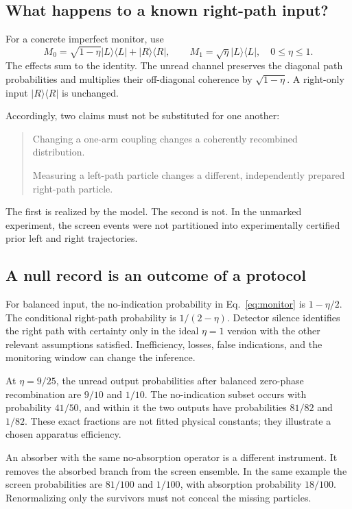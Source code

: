 \documentclass[11pt,a4paper]{article}
\newcommand{\ket}[1]{\lvert #1\rangle}
\newcommand{\bra}[1]{\langle #1\rvert}
\begin{document}
\subsection{What happens to a known right-path input?}
For a concrete imperfect monitor, use
\begin{equation}
M_0=\sqrt{1-\eta}\ket L\bra L+\ket R\bra R,\qquad
M_1=\sqrt{\eta}\ket L\bra L,\quad 0\leq\eta\leq1.
\label{eq:monitor}
\end{equation}
The effects sum to the identity. The unread channel preserves the diagonal path probabilities and multiplies their off-diagonal coherence by \(\sqrt{1-\eta}\). A right-only input \(\ket R\bra R\) is unchanged.

Accordingly, two claims must not be substituted for one another:
\begin{quote}
Changing a one-arm coupling changes a coherently recombined distribution.

Measuring a left-path particle changes a different, independently prepared right-path particle.
\end{quote}
The first is realized by the model. The second is not. In the unmarked experiment, the screen events were not partitioned into experimentally certified prior left and right trajectories.

\subsection{A null record is an outcome of a protocol}
For balanced input, the no-indication probability in Eq.~\eqref{eq:monitor} is \(1-\eta/2\). The conditional right-path probability is \(1/(2-\eta)\). Detector silence identifies the right path with certainty only in the ideal \(\eta=1\) version with the other relevant assumptions satisfied. Inefficiency, losses, false indications, and the monitoring window can change the inference.

At \(\eta=9/25\), the unread output probabilities after balanced zero-phase recombination are \(9/10\) and \(1/10\). The no-indication subset occurs with probability \(41/50\), and within it the two outputs have probabilities \(81/82\) and \(1/82\). These exact fractions are not fitted physical constants; they illustrate a chosen apparatus efficiency.

An absorber with the same no-absorption operator is a different instrument. It removes the absorbed branch from the screen ensemble. In the same example the screen probabilities are \(81/100\) and \(1/100\), with absorption probability \(18/100\). Renormalizing only the survivors must not conceal the missing particles.
\end{document}
